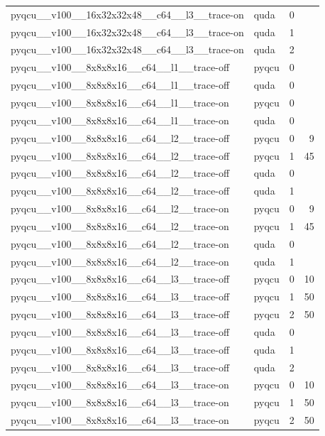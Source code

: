 \begin{table}[htbp]
\begin{tabular}{@{}llrr@{}}
pyqcu\_\_v100\_\_16x32x32x48\_\_c64\_\_l3\_\_trace-on & quda & 0 &  \\
pyqcu\_\_v100\_\_16x32x32x48\_\_c64\_\_l3\_\_trace-on & quda & 1 &  \\
pyqcu\_\_v100\_\_16x32x32x48\_\_c64\_\_l3\_\_trace-on & quda & 2 &  \\
pyqcu\_\_v100\_\_8x8x8x16\_\_c64\_\_l1\_\_trace-off & pyqcu & 0 &  \\
pyqcu\_\_v100\_\_8x8x8x16\_\_c64\_\_l1\_\_trace-off & quda & 0 &  \\
pyqcu\_\_v100\_\_8x8x8x16\_\_c64\_\_l1\_\_trace-on & pyqcu & 0 &  \\
pyqcu\_\_v100\_\_8x8x8x16\_\_c64\_\_l1\_\_trace-on & quda & 0 &  \\
pyqcu\_\_v100\_\_8x8x8x16\_\_c64\_\_l2\_\_trace-off & pyqcu & 0 & 9 \\
pyqcu\_\_v100\_\_8x8x8x16\_\_c64\_\_l2\_\_trace-off & pyqcu & 1 & 45 \\
pyqcu\_\_v100\_\_8x8x8x16\_\_c64\_\_l2\_\_trace-off & quda & 0 &  \\
pyqcu\_\_v100\_\_8x8x8x16\_\_c64\_\_l2\_\_trace-off & quda & 1 &  \\
pyqcu\_\_v100\_\_8x8x8x16\_\_c64\_\_l2\_\_trace-on & pyqcu & 0 & 9 \\
pyqcu\_\_v100\_\_8x8x8x16\_\_c64\_\_l2\_\_trace-on & pyqcu & 1 & 45 \\
pyqcu\_\_v100\_\_8x8x8x16\_\_c64\_\_l2\_\_trace-on & quda & 0 &  \\
pyqcu\_\_v100\_\_8x8x8x16\_\_c64\_\_l2\_\_trace-on & quda & 1 &  \\
pyqcu\_\_v100\_\_8x8x8x16\_\_c64\_\_l3\_\_trace-off & pyqcu & 0 & 10 \\
pyqcu\_\_v100\_\_8x8x8x16\_\_c64\_\_l3\_\_trace-off & pyqcu & 1 & 50 \\
pyqcu\_\_v100\_\_8x8x8x16\_\_c64\_\_l3\_\_trace-off & pyqcu & 2 & 50 \\
pyqcu\_\_v100\_\_8x8x8x16\_\_c64\_\_l3\_\_trace-off & quda & 0 &  \\
pyqcu\_\_v100\_\_8x8x8x16\_\_c64\_\_l3\_\_trace-off & quda & 1 &  \\
pyqcu\_\_v100\_\_8x8x8x16\_\_c64\_\_l3\_\_trace-off & quda & 2 &  \\
pyqcu\_\_v100\_\_8x8x8x16\_\_c64\_\_l3\_\_trace-on & pyqcu & 0 & 10 \\
pyqcu\_\_v100\_\_8x8x8x16\_\_c64\_\_l3\_\_trace-on & pyqcu & 1 & 50 \\
pyqcu\_\_v100\_\_8x8x8x16\_\_c64\_\_l3\_\_trace-on & pyqcu & 2 & 50 \\

\end{tabular}
\end{table}
